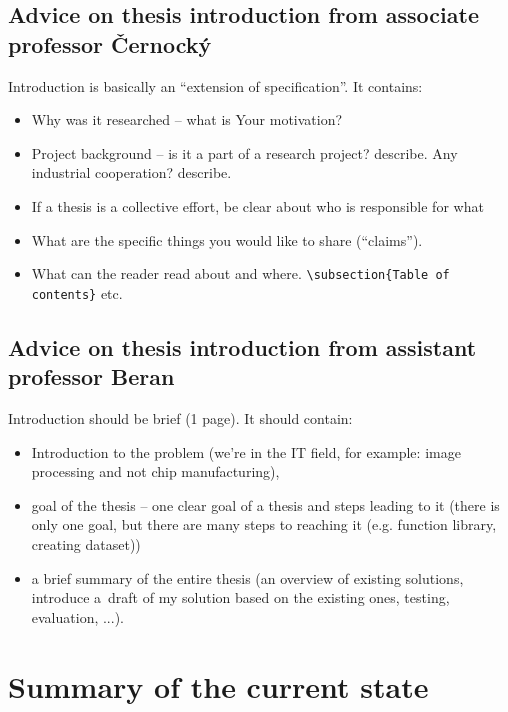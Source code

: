 \subsection*{Advice on thesis introduction from associate professor Černocký}

Introduction is basically an ``extension of specification''. It contains:

\begin{itemize}
  \item{Why was it researched -- what is Your motivation?}
  \item{Project background -- is it a part of a research project? describe. Any industrial cooperation? describe.}
  \item{If a thesis is a collective effort, be clear about who is responsible for what}
  \item{What are the specific things you would like to share (``claims'').}
  \item{What can the reader read about and where. \texttt{\textbackslash subsection\{Table of contents\}} etc.}
\end{itemize}

\subsection*{Advice on thesis introduction from assistant professor Beran}

Introduction should be brief (1 page). It should contain:
\begin{itemize}
  \item{Introduction to the problem (we're in the IT field, for example: image processing and not chip manufacturing),}
  \item{goal of the thesis -- one clear goal of a thesis and steps leading to it (there is only one goal, but there are many steps to reaching it (e.g. function library, creating dataset))}
  \item{a brief summary of the entire thesis (an overview of existing solutions, introduce a~draft of my solution based on the existing ones, testing, evaluation, ...).}
\end{itemize}


\section{Summary of the current state}
\label{stav}


